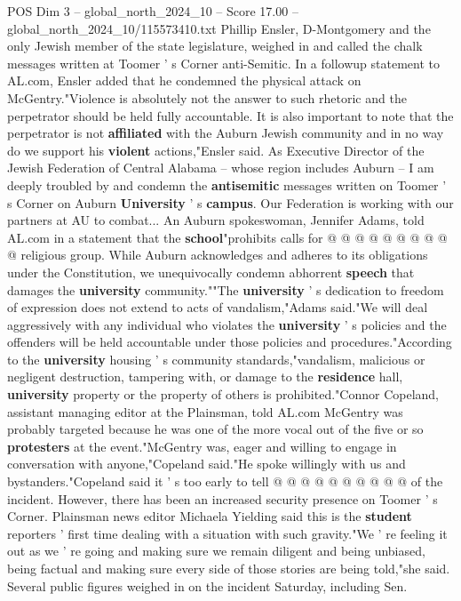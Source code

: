 \begin{textsample}{POS Dim 3 – global\_north\_2024\_10 – Score 17.00 – global\_north\_2024\_10/115573410.txt}
Phillip Ensler, D-Montgomery and the only Jewish member of the state legislature, weighed in and called the chalk messages written at Toomer ' s Corner anti-Semitic.
In a followup statement to AL.com, Ensler added that he condemned the physical attack on McGentry."Violence is absolutely not the answer to such rhetoric and the perpetrator should be held fully accountable.
It is also important to note that the perpetrator is not \textbf{affiliated} with the Auburn Jewish community and in no way do we support his \textbf{violent} actions,"Ensler said.
As Executive Director of the Jewish Federation of Central Alabama -- whose region includes Auburn -- I am deeply troubled by and condemn the \textbf{antisemitic} messages written on Toomer ' s Corner on Auburn \textbf{University} ' s \textbf{campus}.
Our Federation is working with our partners at AU to combat...
An Auburn spokeswoman, Jennifer Adams, told AL.com in a statement that the \textbf{school}"prohibits calls for @ @ @ @ @ @ @ @ @ @ religious group.
While Auburn acknowledges and adheres to its obligations under the Constitution, we unequivocally condemn abhorrent \textbf{speech} that damages the \textbf{university} community.""The \textbf{university} ' s dedication to freedom of expression does not extend to acts of vandalism,"Adams said."We will deal aggressively with any individual who violates the \textbf{university} ' s policies and the offenders will be held accountable under those policies and procedures."According to the \textbf{university} housing ' s community standards,"vandalism, malicious or negligent destruction, tampering with, or damage to the \textbf{residence} hall, \textbf{university} property or the property of others is prohibited."Connor Copeland, assistant managing editor at the Plainsman, told AL.com McGentry was probably targeted because he was one of the more vocal out of the five or so \textbf{protesters} at the event."McGentry was, eager and willing to engage in conversation with anyone,"Copeland said."He spoke willingly with us and bystanders."Copeland said it ' s too early to tell @ @ @ @ @ @ @ @ @ @ of the incident.
However, there has been an increased security presence on Toomer ' s Corner.
Plainsman news editor Michaela Yielding said this is the \textbf{student} reporters ' first time dealing with a situation with such gravity."We ' re feeling it out as we ' re going and making sure we remain diligent and being unbiased, being factual and making sure every side of those stories are being told,"she said.
Several public figures weighed in on the incident Saturday, including Sen.

\end{textsample}
